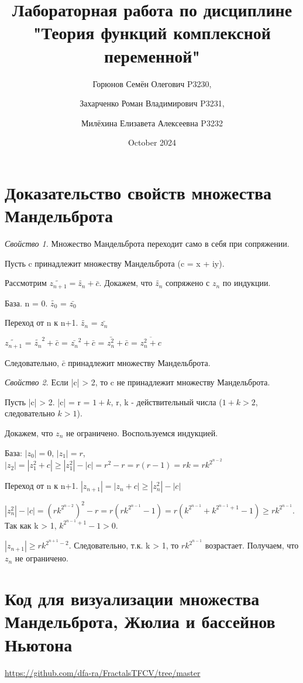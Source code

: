 \documentclass{article}
\title{Лабораторная работа по дисциплине "Теория функций комплексной переменной"}
\author{Горюнов Семён Олегович P3230, \and Захарченко Роман Владимирович P3231, \and Милёхина Елизавета Алексеевна P3232}
\date{October 2024}
\begin{document}
\maketitle

\section{Доказательство свойств множества Мандельброта}
\par \textit{Свойство 1.} Множество Мандельброта переходит само в себя при сопряжении.
\par Пусть c принадлежит множеству Мандельброта (c = x + iy).
\par Рассмотрим $\widetilde{z_{n+1}} = \widetilde{z_{n}}  + \bar c$. 
Докажем, что $\widetilde{z_{n}}$ сопряжено с ${z_{n}}$ по индукции.
\par База. n = 0.
$\widetilde{z_{0}}$ = $\bar{z_{0}}$
\par Переход от n к n+1. $\widetilde{z_{n}}$ = $\bar{z_{n}}$
\par $\widetilde{z_{n+1}}$ = $\widetilde{z_{n}}^2 + \bar c$ = $\bar{z_{n}}^2 + \bar c$ = $\bar{z_{n}^2} + \bar c$ = $\overline{z_{n}^2 + c}$
\par Следовательно, $\bar c$ принадлежит множеству Мандельброта.
\newline
\par \textit{Свойство 2.} Если |c| > 2, то c не принадлежит множеству Мандельброта.
\par Пусть |c| > 2. |c| = r = $1 + k$, r, k - действительный числа ($1 + k > 2$, следовательно $k > 1$).
\par Докажем, что $z_{n}$ не ограничено. Воспользуемся индукцией.
\par База: $|z_{0}| = 0$, $|z_{1}| = r$,  $|z_{2}| = |z_{1}^2 + c| \ge |z_{1}^2| - |c| = r^2 - r = r(r-1) = rk = rk^{2^{n-2}}$
\par Переход от n к n+1. $|z_{n+1}| = |z_{n} + c| \ge |z_{n}^2| - |c|$
\par $|z_{n}^2| - |c| = (rk^{2^{n-2}})^2 - r = r(rk^{2^{n-1}} - 1) = r(k^{2^{n-1}} + k^{2^{n-1}+1} - 1) \ge rk^{2^{n-1}}$. Так как k > 1, $k^{2^{n-1}+1} - 1 > 0$.
\par $|z_{n+1}| \ge rk^{2^{n+1}-2}$. Следовательно, т.к. k > 1, то $rk^{2^{n-1}}$ возрастает. Получаем, что $z_{n}$ не ограничено.
\section{Код для визуализации множества Мандельброта, Жюлиа и бассейнов Ньютона}
\url{https://github.com/dfa-ra/FractalsTFCV/tree/master}
\end{document}
